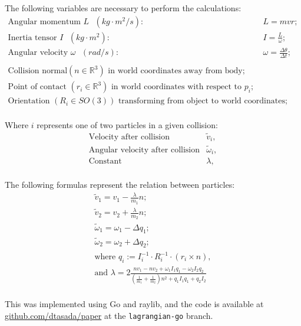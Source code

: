 \documentclass[a4paper,12pt]{article}
\begin{document}
The following variables are necessary to perform the calculations:
\[
\begin{array}{ll}
	\text{Angular momentum $L$ } (kg\cdot m^2/s): & L = mvr; \\
	\text{Inertia tensor $I$ } (kg\cdot m^2): & I = \frac{L}{\omega}; \\
    \text{Angular velocity $\omega$ } (rad/s): & \omega = \frac{\Delta \theta}{\Delta t}; \\

	\\

	\text{Collision normal} (n \in \mathbb{R}^3) \text{ in world coordinates away from body}; \\
	\text{Point of contact } (r_i \in \mathbb{R}^3) \text{ in world coordinates with respect to $p_i$}; \\
	\text{Orientation } (R_i \in SO(3)) \text{ transforming from object to world coordinates}; \\
\end{array}
\]

Where $i$ represents one of two particles in a given collision:
\[
\begin{array}{ll}
	\text{Velocity after collision} & \tilde{v}_i, \\ 
	\text{Angular velocity after collision} & \tilde{\omega}_i, \\
	\text{Constant} & \lambda, \\
\end{array}
\]

The following formulas represent the relation between particles:
\[
\begin{array}{cc}
	\tilde{v}_1 = v_1 - \frac{\lambda}{m_1} n; \\ 
	\tilde{v}_2 = v_2 + \frac{\lambda}{m_2} n; \\
	\tilde{\omega}_1 = \omega_1 - \Delta q_1; \\
	\tilde{\omega}_2 = \omega_2 + \Delta q_2; \\

	\text{where } q_i := I_i^{-1} \cdot R_i^{-1} \cdot (r_i\times n), \\
	\text{and } \lambda = 2 \frac{n v_1 - n v_2 + \omega_1 I_1 q_1 - \omega_2 I_2 q_2}
	{(\frac{1}{m_1} + \frac{1}{m_2})n^2 + q_1 I_1 q_1 + q_2 I_2} \\
\end{array}
\]

This was implemented using Go and raylib, and the code is available at
\href{www.github.com/dtasada/paper}{github.com/dtasada/paper} at the \lstinline{lagrangian-go} branch.
\end{document}
